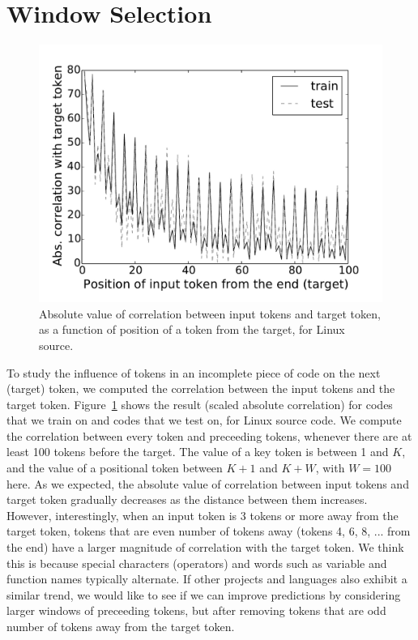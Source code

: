 \section{Window Selection}
\label{sec:window}

\begin{figure}[h]
  \centering
  \includegraphics[width=\linewidth]{figs/correlation.pdf}
  \caption{Absolute value of correlation between input tokens and target token,
    as a function of position of a token from the target, for Linux source.}
  \label{fig:correlation}
\end{figure}

\noindent
To study the influence of tokens in an incomplete piece of code on the next
(target) token, we computed the correlation between the input tokens and the
target token.
Figure~\ref{fig:correlation} shows the result (scaled absolute correlation) for
codes that we train on and codes that we test on, for Linux
source code.
We compute the correlation between every token and preceeding tokens, whenever
there are at least 100 tokens before the target.
The value of a key token is between 1 and $K$, and the value of a positional
token between $K+1$ and $K+W$, with $W=100$ here.
As we expected, the absolute value of correlation between input tokens and
target token gradually decreases as the distance between them increases.
However, interestingly, when an input token is 3 tokens or more away from the
target token, tokens that are even number of tokens away (tokens 4, 6, 8, ...
from the end) have a larger magnitude of correlation with the target token.
We think this is because special characters (operators) and words such as variable and
function names typically alternate. If other projects and languages
also exhibit a similar trend, we would like to see if we can improve
predictions by considering larger windows of preceeding tokens, but after
removing tokens that are odd number of tokens away from the target token.
